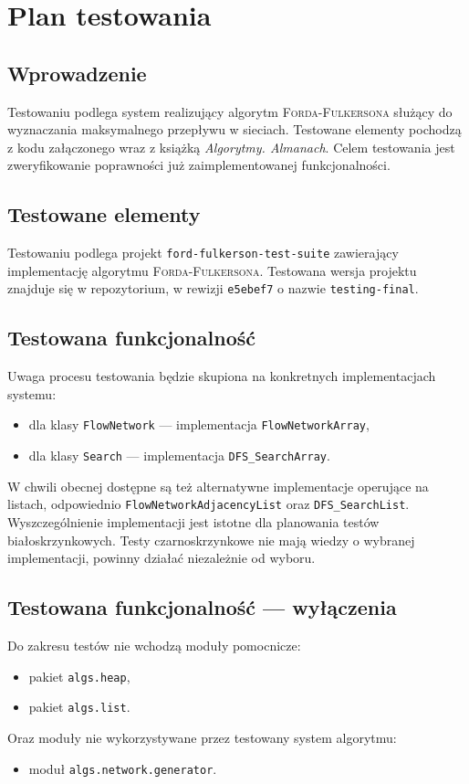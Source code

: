 \documentclass[10pt]{dokument-tiwo}
\begin{document}
\MakeDokumentMeta


\section{Plan testowania}

\subsection{Wprowadzenie}
Testowaniu podlega system realizujący algorytm \textsc{Forda-Fulkersona} służący
do wyznaczania maksymalnego przepływu w sieciach. Testowane elementy pochodzą z
kodu załączonego wraz z książką \emph{Algorytmy. Almanach}. Celem testowania
jest zweryfikowanie poprawności już zaimplementowanej funkcjonalności.

\subsection{Testowane elementy}
Testowaniu podlega projekt \texttt{ford-fulkerson-test-suite} zawierający
implementację algorytmu \textsc{Forda-Fulkersona}. Testowana wersja projektu
znajduje się w repozytorium, w rewizji \texttt{e5ebef7} o nazwie \texttt
{testing-final}.

\subsection{Testowana funkcjonalność}
Uwaga procesu testowania będzie skupiona na konkretnych implementacjach systemu:
\begin{itemize}
    \item dla klasy \texttt{FlowNetwork} --- implementacja
        \texttt{FlowNetworkArray},
    \item dla klasy \texttt{Search} --- implementacja \texttt{DFS\_SearchArray}.
\end{itemize}
W chwili obecnej dostępne są też alternatywne implementacje operujące na
listach, odpowiednio \texttt{FlowNetworkAdjacencyList} oraz
\texttt{DFS\_SearchList}. Wyszczególnienie implementacji jest istotne dla
planowania testów biało\dywiz skrzynkowych. Testy czarno\dywiz skrzynkowe
nie mają wiedzy o wybranej implementacji, powinny działać niezależnie od wyboru.

\subsection{Testowana funkcjonalność --- wyłączenia}
Do zakresu testów nie wchodzą moduły pomocnicze:
\begin{itemize}
    \item pakiet \texttt{algs.heap},
    \item pakiet \texttt{algs.list}.
\end{itemize}
Oraz moduły nie wykorzystywane przez testowany system algorytmu:
\begin{itemize}
    \item moduł \texttt{algs.network.generator}.
\end{itemize}
\end{document}
